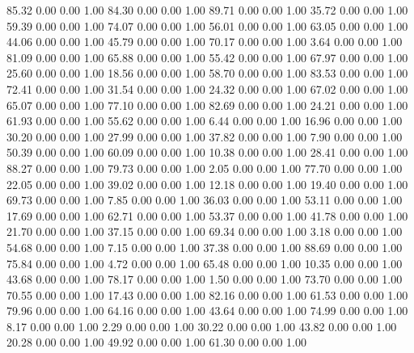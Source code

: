    85.32   0.00   0.00   1.00
   84.30   0.00   0.00   1.00
   89.71   0.00   0.00   1.00
   35.72   0.00   0.00   1.00
   59.39   0.00   0.00   1.00
   74.07   0.00   0.00   1.00
   56.01   0.00   0.00   1.00
   63.05   0.00   0.00   1.00
   44.06   0.00   0.00   1.00
   45.79   0.00   0.00   1.00
   70.17   0.00   0.00   1.00
    3.64   0.00   0.00   1.00
   81.09   0.00   0.00   1.00
   65.88   0.00   0.00   1.00
   55.42   0.00   0.00   1.00
   67.97   0.00   0.00   1.00
   25.60   0.00   0.00   1.00
   18.56   0.00   0.00   1.00
   58.70   0.00   0.00   1.00
   83.53   0.00   0.00   1.00
   72.41   0.00   0.00   1.00
   31.54   0.00   0.00   1.00
   24.32   0.00   0.00   1.00
   67.02   0.00   0.00   1.00
   65.07   0.00   0.00   1.00
   77.10   0.00   0.00   1.00
   82.69   0.00   0.00   1.00
   24.21   0.00   0.00   1.00
   61.93   0.00   0.00   1.00
   55.62   0.00   0.00   1.00
    6.44   0.00   0.00   1.00
   16.96   0.00   0.00   1.00
   30.20   0.00   0.00   1.00
   27.99   0.00   0.00   1.00
   37.82   0.00   0.00   1.00
    7.90   0.00   0.00   1.00
   50.39   0.00   0.00   1.00
   60.09   0.00   0.00   1.00
   10.38   0.00   0.00   1.00
   28.41   0.00   0.00   1.00
   88.27   0.00   0.00   1.00
   79.73   0.00   0.00   1.00
    2.05   0.00   0.00   1.00
   77.70   0.00   0.00   1.00
   22.05   0.00   0.00   1.00
   39.02   0.00   0.00   1.00
   12.18   0.00   0.00   1.00
   19.40   0.00   0.00   1.00
   69.73   0.00   0.00   1.00
    7.85   0.00   0.00   1.00
   36.03   0.00   0.00   1.00
   53.11   0.00   0.00   1.00
   17.69   0.00   0.00   1.00
   62.71   0.00   0.00   1.00
   53.37   0.00   0.00   1.00
   41.78   0.00   0.00   1.00
   21.70   0.00   0.00   1.00
   37.15   0.00   0.00   1.00
   69.34   0.00   0.00   1.00
    3.18   0.00   0.00   1.00
   54.68   0.00   0.00   1.00
    7.15   0.00   0.00   1.00
   37.38   0.00   0.00   1.00
   88.69   0.00   0.00   1.00
   75.84   0.00   0.00   1.00
    4.72   0.00   0.00   1.00
   65.48   0.00   0.00   1.00
   10.35   0.00   0.00   1.00
   43.68   0.00   0.00   1.00
   78.17   0.00   0.00   1.00
    1.50   0.00   0.00   1.00
   73.70   0.00   0.00   1.00
   70.55   0.00   0.00   1.00
   17.43   0.00   0.00   1.00
   82.16   0.00   0.00   1.00
   61.53   0.00   0.00   1.00
   79.96   0.00   0.00   1.00
   64.16   0.00   0.00   1.00
   43.64   0.00   0.00   1.00
   74.99   0.00   0.00   1.00
    8.17   0.00   0.00   1.00
    2.29   0.00   0.00   1.00
   30.22   0.00   0.00   1.00
   43.82   0.00   0.00   1.00
   20.28   0.00   0.00   1.00
   49.92   0.00   0.00   1.00
   61.30   0.00   0.00   1.00
